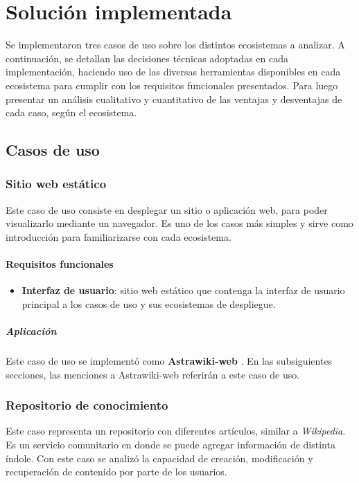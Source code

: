 \section{Solución implementada}

Se implementaron tres casos de uso sobre los distintos ecosistemas a analizar. A continuación, se detallan las decisiones técnicas adoptadas en cada implementación, haciendo uso de las diversas herramientas disponibles en cada ecosistema para cumplir con los requisitos funcionales presentados. Para luego presentar un análisis cualitativo y cuantitativo de las ventajas y desventajas de cada caso, según el ecosistema.

\subsection{Casos de uso}

\subsubsection{Sitio web estático}

Este caso de uso consiste en desplegar un sitio o aplicación web, para poder visualizarlo mediante un navegador. Es uno de los casos más simples y sirve como introducción para familiarizarse con cada ecosistema.

\paragraph{Requisitos funcionales}

\begin{itemize}
    \item \textbf{Interfaz de usuario}: sitio web estático que contenga la interfaz de usuario principal a los casos de uso y sus ecosistemas de despliegue.
\end{itemize}

\subparagraph{Aplicación}

Este caso de uso se implementó como \textbf{Astrawiki-web} \cite{astrawiki-web}. En las subsiguientes secciones, las menciones a Astrawiki-web referirán a este caso de uso.

\subsubsection{Repositorio de conocimiento}

Este caso representa un repositorio con diferentes artículos, similar a \textit{Wikipedia}. Es un servicio comunitario en donde se puede agregar información de distinta índole. Con este caso se analizó la capacidad de creación, modificación y recuperación de contenido por parte de los usuarios.

